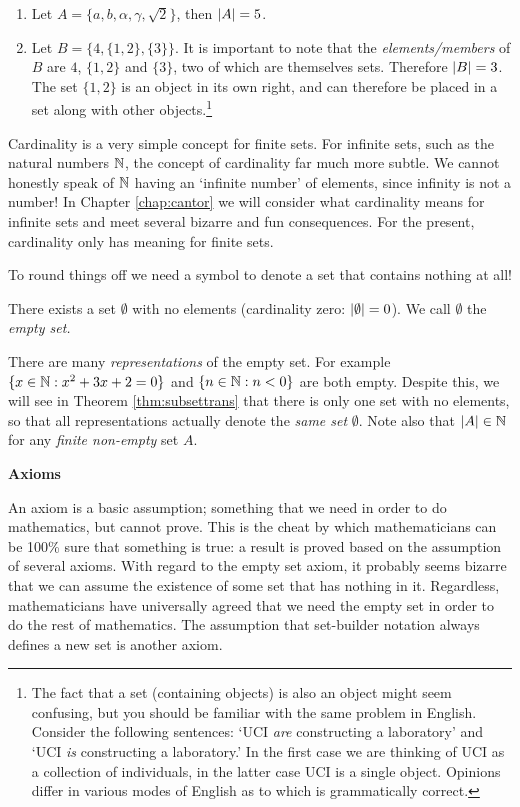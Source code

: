 \begin{examples}{}{}
\begin{enumerate}
\item Let $A=\{a,b,\alpha,\gamma,\sqrt 2\}$, then $\left| A\right|=5$.
\item Let $B=\Big\{4,\{1,2\},\{3\}\Big\}$. It is important to note that the \emph{elements/members} of $B$ are $4$, $\{1,2\}$ and $\{3\}$, two of which are themselves sets. Therefore $\left| B\right|=3$. The set $\{1,2\}$ is an object in its own right, and can therefore be placed in a set along with other objects.\footnote{The fact that a set (containing objects) is also an object might seem confusing, but you should be familiar with the same problem in English. Consider the following sentences: `UCI \emph{are} constructing a laboratory' and `UCI \emph{is} constructing a laboratory.' In the first case we are thinking of UCI as a collection of individuals, in the latter case UCI is a single object. Opinions differ in various modes of English as to which is grammatically correct.}
\end{enumerate}
\end{examples}

Cardinality is a very simple concept for finite sets. For infinite sets, such as the natural numbers $\mathbb{N}$, the concept of cardinality far much more subtle. We cannot honestly speak of $\mathbb{N}$ having an `infinite number' of elements, since infinity is not a number! In Chapter \ref{chap:cantor} we will consider what cardinality means for infinite sets and meet several bizarre and fun consequences. For the present, cardinality only has meaning for finite sets.\par

To round things off we need a symbol to denote a set that contains nothing at all!

\begin{axiom}{}{}
There exists a set $\emptyset$ with no elements (cardinality zero: $\left| \emptyset\right|=0$). We call $\emptyset$ the \emph{empty set.}
\end{axiom}

There are many \emph{representations} of the empty set. For example $\{x\in\mathbb{N}:x^2+3x+2=0\}$ and $\{n\in\mathbb{N}:n<0\}$ are both empty. Despite this, we will see in Theorem \hyperlink{thm:subsettranslnk}{\ref*{thm:subsettrans}} that there is only one set with no elements, so that all representations actually denote the \emph{same set} $\emptyset$. 
Note also that $\left| A\right|\in\mathbb{N}$ for any \emph{finite non-empty} set $A$. 

\begin{aside}{}{}
{\bf Axioms}

An axiom is a basic assumption; something that we need in order to do mathematics, but cannot prove. This is the cheat by which mathematicians can be 100\% sure that something is true: a result is proved based on the assumption of several axioms. With regard to the empty set axiom, it probably seems bizarre that we can assume the existence of some set that has nothing in it. Regardless, mathematicians have universally agreed that we need the empty set in order to do the rest of mathematics. The assumption that set-builder notation always defines a new set is another axiom.
\end{aside}

